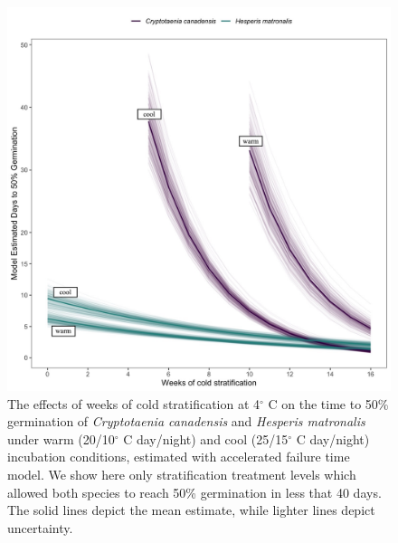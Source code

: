 \documentclass{article}[11pt]
\begin{document}
{{\begin{figure}[h!]
    \centering
          \includegraphics[width=\textwidth]{..//figure/AFTsivansive.jpeg}
\caption{The effects of weeks of cold stratification at 4$^{\circ}$ C on the time to 50\% germination of \textit {Cryptotaenia canadensis} and \textit{Hesperis matronalis} under warm (20/10$^{\circ}$ C day/night) and cool (25/15$^{\circ}$ C day/night) incubation conditions, estimated with accelerated failure time model. We show here only stratification treatment levels which allowed both species to reach 50\% germination in less that 40 days. The solid lines depict the mean estimate, while lighter lines depict uncertainty.} %
    \label{fig:aft}
\end{figure}


}}
\end{document}

